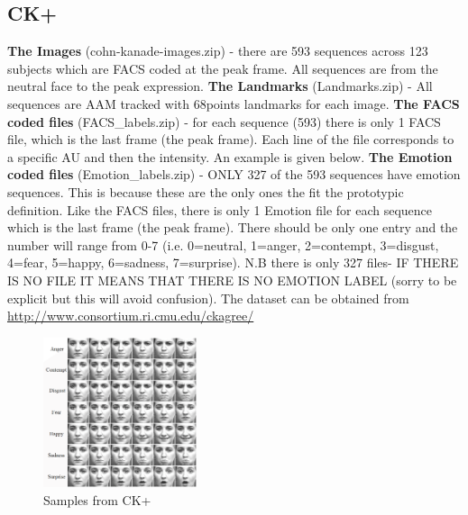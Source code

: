 \documentclass[11pt]{article}
\begin{document}
	\subsection{CK+ \cite{lucey2010extended}}
	\textbf{The Images} (cohn-kanade-images.zip) -  there are 593 sequences across 123 subjects which are FACS coded at the peak frame. All sequences are from the neutral face to the peak expression.
	\newline
	\newline
	\textbf{The Landmarks} (Landmarks.zip) - All sequences are AAM tracked with 68points landmarks for each image.
	\newline
	\newline
	\textbf{The FACS coded files} (FACS\_labels.zip) - for each sequence (593) there is only 1 FACS file, which is the last frame (the peak frame). Each line of the file corresponds to a specific AU and then the intensity. An example is given below.
	\newline
	\newline
	\textbf{The Emotion coded files} (Emotion\_labels.zip) - ONLY 327 of the 593 sequences have emotion sequences. This is because these are the only ones the fit the prototypic definition. Like the FACS files, there is only 1 Emotion file for each sequence which is the last frame (the peak frame). There should be only one entry and the number will range from 0-7 (i.e. 0=neutral, 1=anger, 2=contempt, 3=disgust, 4=fear, 5=happy, 6=sadness, 7=surprise). N.B there is only 327 files- IF THERE IS NO FILE IT MEANS THAT THERE IS NO EMOTION LABEL (sorry to be explicit but this will avoid confusion).
	\newline
	\newline
	The dataset can be obtained from
	\newline
	\def\UrlFont{\bfseries}
	\url{http://www.consortium.ri.cmu.edu/ckagree/}
	\begin{figure}[ht]
		\centering
		\includegraphics[width=0.4\textwidth]{ck+_images}
		\caption{Samples from CK+}
	\end{figure}
	\newpage
	
\end{document}
